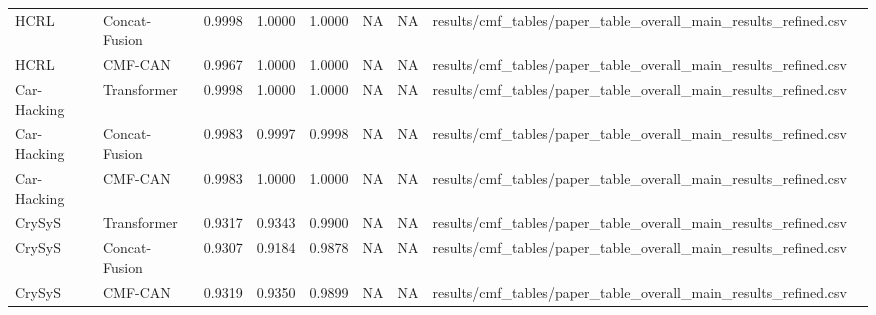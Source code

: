\begin{tabular}{llrrrrrll}
HCRL & Concat-Fusion & 0.9998 & 1.0000 & 1.0000 & NA & NA & results/cmf\_tables/paper\_table\_overall\_main\_results\_refined.csv &  \\
HCRL & CMF-CAN & 0.9967 & 1.0000 & 1.0000 & NA & NA & results/cmf\_tables/paper\_table\_overall\_main\_results\_refined.csv &  \\
Car-Hacking & Transformer & 0.9998 & 1.0000 & 1.0000 & NA & NA & results/cmf\_tables/paper\_table\_overall\_main\_results\_refined.csv &  \\
Car-Hacking & Concat-Fusion & 0.9983 & 0.9997 & 0.9998 & NA & NA & results/cmf\_tables/paper\_table\_overall\_main\_results\_refined.csv &  \\
Car-Hacking & CMF-CAN & 0.9983 & 1.0000 & 1.0000 & NA & NA & results/cmf\_tables/paper\_table\_overall\_main\_results\_refined.csv &  \\
CrySyS & Transformer & 0.9317 & 0.9343 & 0.9900 & NA & NA & results/cmf\_tables/paper\_table\_overall\_main\_results\_refined.csv &  \\
CrySyS & Concat-Fusion & 0.9307 & 0.9184 & 0.9878 & NA & NA & results/cmf\_tables/paper\_table\_overall\_main\_results\_refined.csv &  \\
CrySyS & CMF-CAN & 0.9319 & 0.9350 & 0.9899 & NA & NA & results/cmf\_tables/paper\_table\_overall\_main\_results\_refined.csv &  \\
\bottomrule
\end{tabular}
